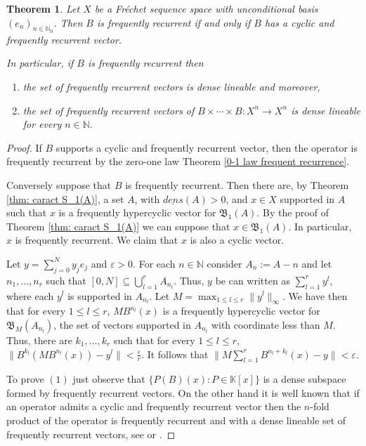 \documentclass[11pt]{amsart}
\newtheorem{theorem}{Theorem}[section]
\newcommand{\zK}{\mathbb K}
\begin{document}
\begin{theorem}\label{cyclic and frequently recurrent vector}
Let $X$ be a Fr\'echet sequence space with unconditional basis $(e_n)_{n\in\mathbb N_0}$. Then  $B$ is frequently recurrent if and only if $B$ has a cyclic and frequently recurrent vector.

In particular, if $B$ is frequently recurrent then
\begin{enumerate}
    \item the set of frequently recurrent vectors is dense lineable and moreover,
    \item the set of frequently recurrent vectors of $B\times\cdots \times B:X^n\to X^n$ is dense lineable for every $n\in\mathbb N.$
\end{enumerate}
\end{theorem}
\begin{proof}
If $B$ supports a cyclic and frequently recurrent vector, then the operator is frequently recurrent by the zero-one law Theorem \ref{0-1 law frequent recurrence}.

Conversely suppose that $B$ is frequently recurrent. Then there are, by  Theorem \ref{thm: caract S_1(A)}, a set $A$, with $\underline{dens}(A)>0$, and $x\in X$ supported in $A$ such that $x$ is a frequently hypercyclic vector for $\mathfrak B_1(A)$. By the proof of Theorem \ref{thm: caract S_1(A)} we can suppose that $x\in \mathfrak{B}_1(A)$. In particular, $x$ is frequently recurrent. We claim that $x$ is also a cyclic vector.

Let $y=\sum_{j=0}^N y_j e_j$ and $\varepsilon>0$. For each $n\in \mathbb N$ consider $A_n:=A-n$ and let $n_1,\ldots, n_r$ such that $[0,N]\subseteq \bigcup_{l=1}^r A_{n_l}$. 
Thus, $y$ be can written as $\sum_{l=1}^r y^l$, where each $y^l$ is supported in $A_{n_l}$. Let {$M=\max_{1\le l\le r}\|y^l\|_\infty$}. We have then that for every $1\leq l\leq r$, $M B^{n_l}(x)$ is a frequently hypercyclic vector for $\mathfrak B_M(A_{n_l})$, the set of vectors supported in $A_{n_l}$ with coordinate less than $M$. Thus, there are $k_1,\ldots, k_r$ such that for every $1\leq l\leq r$, $\|B^{k_l}(MB^{n_l}(x))-y^l\|<\frac{\varepsilon}{r}.$
It follows that $\|M\sum_{l=1}^r B^{n_l+k_l}(x)-y\|<\varepsilon.$

To prove $(1)$ just observe that $\{P(B)(x):P\in \zK[x]\}$ is a dense subspace formed by frequently recurrent vectors.
On the other hand it is well known that if an operator admits a cyclic and frequently recurrent vector then the $n$-fold product of the operator is frequently recurrent and with a dense lineable set of frequently recurrent vectors, see  \cite[Proposition 3.8]   {CardeMurBlock} or \cite[Proposition 4.2]{GriLopPerQuestions2}.
 \end{proof}
\end{document}
